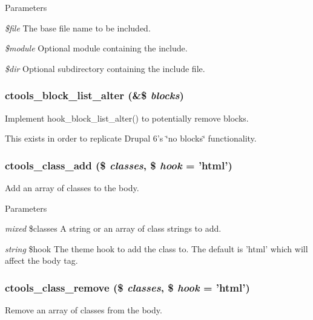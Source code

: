 \begin{DoxyParams}{Parameters}
\item[{\em \$file}]The base file name to be included. \item[{\em \$module}]Optional module containing the include. \item[{\em \$dir}]Optional subdirectory containing the include file. \end{DoxyParams}
\hypertarget{ctools_8module_a75e6c439d7246bcab69763c612716c90}{
\subsubsection[{ctools\_\-block\_\-list\_\-alter}]{\setlength{\rightskip}{0pt plus 5cm}ctools\_\-block\_\-list\_\-alter (\&\$ {\em blocks})}}
\label{ctools_8module_a75e6c439d7246bcab69763c612716c90}
Implement hook\_\-block\_\-list\_\-alter() to potentially remove blocks.

This exists in order to replicate Drupal 6's \char`\"{}no blocks\char`\"{} functionality. \hypertarget{ctools_8module_ab5cc2ffd960a4d73767401993abbfaa4}{
\subsubsection[{ctools\_\-class\_\-add}]{\setlength{\rightskip}{0pt plus 5cm}ctools\_\-class\_\-add (\$ {\em classes}, \/  \$ {\em hook} = {\ttfamily 'html'})}}
\label{ctools_8module_ab5cc2ffd960a4d73767401993abbfaa4}
Add an array of classes to the body.


\begin{DoxyParams}{Parameters}
\item[{\em mixed}]\$classes A string or an array of class strings to add. \item[{\em string}]\$hook The theme hook to add the class to. The default is 'html' which will affect the body tag. \end{DoxyParams}
\hypertarget{ctools_8module_a3f5486d5ce6afc374f0131aa7a71387a}{
\subsubsection[{ctools\_\-class\_\-remove}]{\setlength{\rightskip}{0pt plus 5cm}ctools\_\-class\_\-remove (\$ {\em classes}, \/  \$ {\em hook} = {\ttfamily 'html'})}}
\label{ctools_8module_a3f5486d5ce6afc374f0131aa7a71387a}
Remove an array of classes from the body.


